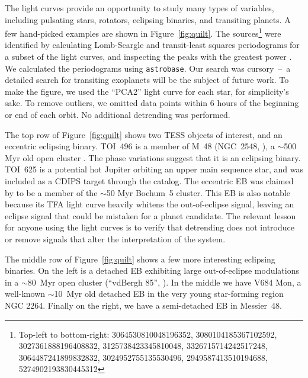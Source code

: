 \documentclass[12pt,twocolumn,tighten]{aastex62}
\begin{document}
The light curves provide an opportunity to study many types of
variables, including pulsating stars, rotators, eclipsing binaries,
and transiting planets.
A few hand-picked examples are shown in Figure~\ref{fig:quilt}.
The sources\footnote{
	Top-left to bottom-right:
	3064530810048196352, 
	3080104185367102592, 
	3027361888196408832,
	3125738423345810048,
	3326715714242517248,
	3064487241899832832,
	3024952755135530496,
	2949587413510194688, 
	5274902193830445312 
} were identified by calculating Lomb-Scargle and transit-least
squares periodograms for a subset of the light curves, and inspecting
the peaks with the greatest power
\citep{lomb_1976,scargle_studies_1982,kovacs_box-fitting_2002,vanderplas_periodograms_2015,hippke_TLS_2019}.
We calculated the periodograms using
\texttt{astrobase}.
Our search was cursory~--~a detailed search for transiting
exoplanets will be the subject of future work.
To make the figure, we used the ``PCA2'' light curve for each
star, for simplicity's sake.
To remove outliers, we omitted
data points within 6 hours of the beginning or end of each orbit.
No additional detrending was performed.

The top row of Figure~\ref{fig:quilt} shows two TESS objects of
interest, and an eccentric eclipsing binary.  TOI~496 is a member of M~48 
(NGC~2548,
\citealt{gaia_collaboration_gaia_2018,cantat-gaudin_gaia_2018}), a
$\sim$500 Myr old open cluster \citep{Kharchenko_et_al_2013}.  The
phase variations suggest that it is an eclipsing binary.  TOI~625 is a
potential hot Jupiter orbiting an upper main sequence star, and was
included as a CDIPS target through the \citet{zari_3d_2018}
catalog.  The eccentric EB was claimed by \citet{dias_proper_2014} to
be a member of the $\sim$50 Myr Bochum~5 cluster.  This EB is also
notable because its TFA light curve heavily whitens the out-of-eclipse
signal, leaving an eclipse signal that could be mistaken for a planet 
candidate.  The relevant lesson
for anyone using the light curves is to verify
that detrending does not introduce or remove signals
that alter the interpretation of the system.

The middle row of Figure~\ref{fig:quilt} shows a few more interesting
eclipsing binaries.  On the left is a detached EB exhibiting large
out-of-eclipse modulations in a $\sim$80~Myr
open cluster (``vdBergh 85'', \citealt{Kharchenko_et_al_2013}).
In the middle we have V684 Mon, a well-known $\sim$10~Myr old
detached EB in the very young star-forming region NGC 2264.
Finally on the right, we have a semi-detached EB in Messier~48.
\end{document}
